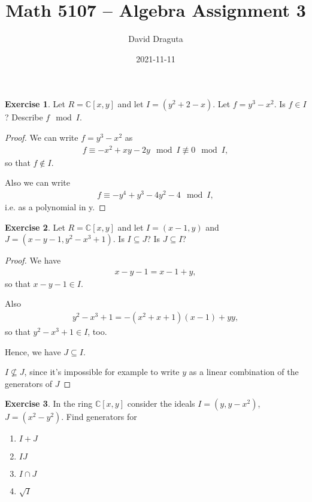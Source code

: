 \documentclass[12pt]{extarticle}
\title{ Math 5107 -- Algebra Assignment 3}
\author{David Draguta}
\date{2021-11-11}
\newcommand{\C}{\mathbb{C}}
\newcommand{\<}{\langle}
\renewcommand{\>}{\rangle}
\theoremstyle{definition}
\newtheorem{exercise}{Exercise}
\begin{document}
\maketitle

\begin{exercise}
  Let $R=\C[x,y]$ and let $I=(y^2+2-x)$. Let $f=y^3-x^2$. Is $f \in I$? Describe $f \mod I$.
\end{exercise}
\begin{proof}
  We can write $f=y^3-x^2$ as
  \begin{align}
    f \equiv -x^2+xy-2y \mod I \not \equiv 0 \mod I ,
  \end{align}
  so that $f \not \in I$.

  Also we can write
  \begin{align*}
    f \equiv -y^4 + y^3 - 4y^2 - 4 \mod I ,
  \end{align*}
  i.e. as a polynomial in y. 
\end{proof}
\begin{exercise}
  Let $R=\C[x,y]$ and let $I=(x-1,y)$ and $J=(x-y-1, y^2-x^3+1)$. Is $I \subseteq J$? Is $J \subseteq I$?
\end{exercise}
\begin{proof}
  We have
  \begin{align}
    x-y-1 = x-1 + y,
  \end{align}
  so that $x-y-1 \in I$.

  Also
  \begin{align}
    y^2-x^3+1 = -(x^2+x+1)(x-1) + yy,
  \end{align}
  so that $y^2-x^3+1 \in I$, too.

  Hence, we have $J \subseteq I$.

  $I \not \subseteq J$, since it's impossible for example to write $y$ as a linear combination of the generators of $J$

\end{proof}

\begin{exercise}
  In the ring $\C[x,y]$ consider the ideals $I = (y,y-x^2)$, $J= (x^2 - y^2)$. Find generators for
  \begin{enumerate}
  \item
    $I + J$
  \item
    $IJ$
  \item
    $I \cap J$
  \item
    $\sqrt{I}$
  \end{enumerate}
\end{exercise}
\end{document}

